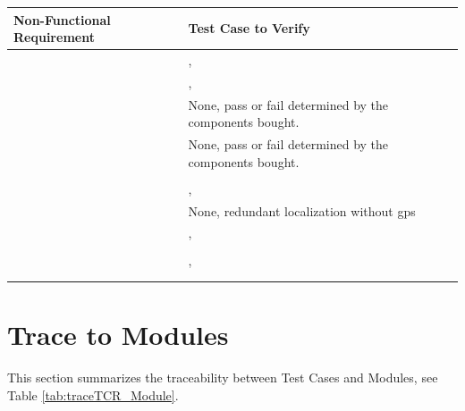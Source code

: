 \documentclass[12pt, titlepage]{article}
\begin{document}
\begin{table}[!h]
\begin{center}
\begin{tabular}{ | m{3cm} | m{12cm} | } 
\hline
Non-Functional Requirement & Test Case to Verify \\
\hline
\nameref{SR_002} & \nameref{tab:STCR_018}, \nameref{tab:UTCR_008} \\ \hline
\nameref{SR_003} & \nameref{tab:STCR_005}, \nameref{tab:STCR_006} \\ \hline
\nameref{SR_004} & None, pass or fail determined by the components bought. \\ \hline
\nameref{SR_005} & None, pass or fail determined by the components bought. \\ \hline
\nameref{SR_006} & \nameref{tab:STCR_018} \\ \hline
\nameref{SR_007} & \nameref{tab:STCR_010}, \nameref{tab:UTCR_016} \\ \hline
\nameref{SR_008} & None, redundant localization without gps \\ \hline
\nameref{SR_009} & \nameref{tab:STCR_015}, \nameref{tab:STCR_014} \\ \hline
\nameref{SR_010} & \nameref{tab:STCR_018} \\ \hline
\nameref{SR_011} & \nameref{tab:STCR_006}, \nameref{tab:UTCR_016} \\ \hline
\nameref{SR_012} & \nameref{tab:STCR_007} \\ \hline
\nameref{SR_013} & \nameref{tab:UTCR_009} \\ \hline
\end{tabular}
\end{center}
\end{table}


\clearpage
		
\section{Trace to Modules}
This section summarizes the traceability between Test Cases and Modules, see Table \ref{tab:traceTCR_Module}. 
\end{document}
